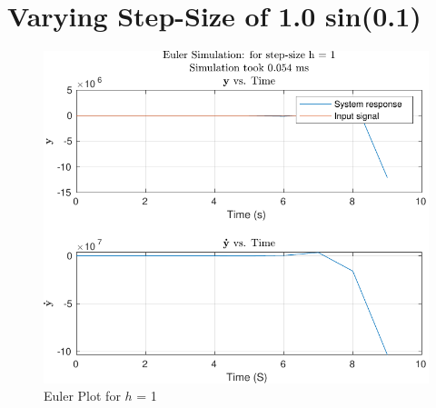 \documentclass[12pt]{article}
\begin{document}
	\section{Varying Step-Size of 1.0 sin(0.1)}
		
		
		
		
		
		\begin{figure}[H]
			\centering
			\includegraphics[width=1\linewidth]{"Code/Fig/Euler_plot_h_1.pdf"}
			\caption{Euler Plot for $h$ = 1}
			\label{fig:eulerploth1}
		\end{figure}	
\end{document}
